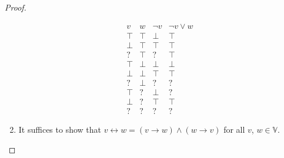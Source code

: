 \documentclass[12pt]{article}
\theoremstyle{definition}
\begin{document}
\begin{proof}
\begin{enumerate}
\[
\begin{array}{ll|l|l}
v     & w     & \neg v & \neg v \vee w\\\hline
\top  & \top  & \perp  & \top\\
\perp & \top  & \top   & \top\\
?     & \top  & ?      & \top\\
\top  & \perp & \perp  & \perp\\
\perp & \perp & \top   & \top\\
?     & \perp & ?      & ?\\
\top  & ?     & \perp  & ?\\
\perp & ?     & \top   & \top\\
?     & ?     & ?      & ?
\end{array}
\]
\item
It suffices to show that $v \leftrightarrow w = (v \rightarrow w) \wedge (w \rightarrow v)$ for all $v$, $w \in \mathbb{V}$.


\end{enumerate}
\end{proof}
\end{document}
